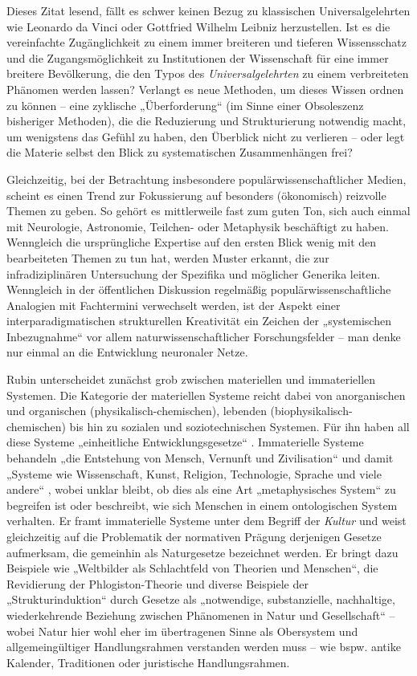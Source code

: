 \documentclass[a4paper,11pt]{article}
\begin{document}
Dieses Zitat lesend, fällt es schwer keinen Bezug zu klassischen
Universalgelehrten wie Leonardo da Vinci oder Gottfried Wilhelm Leibniz
herzustellen.  Ist es die vereinfachte Zugänglichkeit zu einem immer breiteren
und tieferen Wissensschatz und die Zugangsmöglichkeit zu Institutionen der
Wissenschaft für eine immer breitere Bevölkerung, die den Typos des
\emph{Universalgelehrten} zu einem verbreiteten Phänomen werden lassen?
Verlangt es neue Methoden, um dieses Wissen ordnen zu können -- eine zyklische
„Überforderung“ (im Sinne einer Obsoleszenz bisheriger Methoden), die die
Reduzierung und Strukturierung notwendig macht, um wenigstens das Gefühl zu
haben, den Überblick nicht zu verlieren -- oder legt die Materie selbst den
Blick zu systematischen Zusammenhängen frei?

Gleichzeitig, bei der Betrachtung insbesondere populärwissenschaftlicher
Medien, scheint es einen Trend zur Fokussierung auf besonders (ökonomisch)
reizvolle Themen zu geben. So gehört es mittlerweile fast zum guten Ton, sich
auch einmal mit Neurologie, Astronomie, Teilchen- oder Metaphysik beschäftigt
zu haben. Wenngleich die ursprüngliche Expertise auf den ersten Blick wenig
mit den bearbeiteten Themen zu tun hat, werden Muster erkannt, die zur
infradiziplinären Untersuchung der Spezifika und möglicher Generika leiten.
Wenngleich in der öffentlichen Diskussion regelmäßig populärwissenschaftliche
Analogien mit Fachtermini verwechselt werden, ist der Aspekt einer
interparadigmatischen strukturellen Kreativität ein Zeichen der „systemischen
Inbezugnahme“ vor allem naturwissenschaftlicher Forschungsfelder -- man denke
nur einmal an die Entwicklung neuronaler Netze.

Rubin unterscheidet zunächst grob zwischen materiellen und immateriellen
Systemen. Die Kategorie der materiellen Systeme reicht dabei von anorganischen
und organischen (physikalisch-chemischen), lebenden
(biophysikalisch-chemischen) bis hin zu sozialen und soziotechnischen
Systemen.  Für ihn haben all diese Systeme „einheitliche Entwicklungsgesetze“
\cite{Rubin2002}. Immaterielle Systeme behandeln „die Entstehung von Mensch,
Vernunft und Zivilisation“ \cite{Rubin2006} und damit „Systeme wie
Wissenschaft, Kunst, Religion, Technologie, Sprache und viele andere“
\cite{Rubin2006}, wobei unklar bleibt, ob dies als eine Art „metaphysisches
System“ zu begreifen ist oder beschreibt, wie sich Menschen in einem
ontologischen System verhalten. Er framt immaterielle Systeme unter dem
Begriff der \emph{Kultur} und weist gleichzeitig auf die Problematik der
normativen Prägung derjenigen Gesetze aufmerksam, die gemeinhin als
Naturgesetze bezeichnet werden. Er bringt dazu Beispiele wie „Weltbilder als
Schlachtfeld von Theorien und Menschen“, die Revidierung der
Phlogiston-Theorie und diverse Beispiele der „Strukturinduktion“ durch Gesetze
als „notwendige, substanzielle, nachhaltige, wiederkehrende Beziehung zwischen
Phänomenen in Natur und Gesellschaft“ -- wobei Natur hier wohl eher im
übertragenen Sinne als Obersystem und allgemeingültiger Handlungsrahmen
verstanden werden muss -- wie bspw. antike Kalender, Traditionen oder
juristische Handlungsrahmen.
\end{document}
